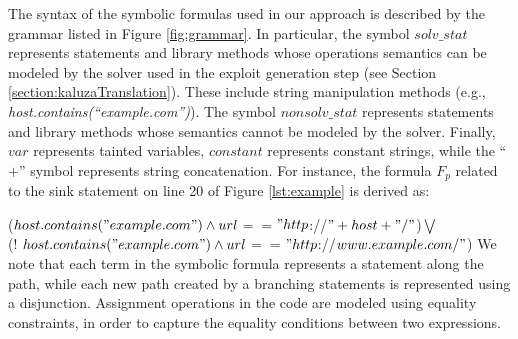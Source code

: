 The syntax of the symbolic formulas used in our approach is described by the grammar listed in Figure \ref{fig:grammar}. 
In particular, the symbol $solv\_stat$ represents statements and library methods whose operations semantics can be modeled by the solver used in the exploit generation step (see Section \ref{section:kaluzaTranslation}). These include string manipulation methods (e.g., \emph{host.contains(``example.com'')}).
The symbol $nonsolv\_stat$ represents statements and library methods whose semantics cannot be modeled by the solver. Finally, $var$ represents tainted variables, $constant$ represents constant strings, while the ``$+$'' symbol represents string concatenation. For instance, the formula $F_p$ related to the sink statement on line 20 of Figure \ref{lst:example} is derived as:

\scriptsize
($host.contains("example.com") \wedge url$$==$$"http$://$"+host+"/"$)$\bigvee$ \\
(! $host.contains("example.com") \wedge url$$==$$"http$://$www.example.com/"$)
\normalsize
We note that each term in the symbolic formula represents a statement along the path, while each new path created by a branching statements is represented using a disjunction. Assignment operations in the code are modeled using equality constraints, in order to capture the equality conditions between two expressions. 



